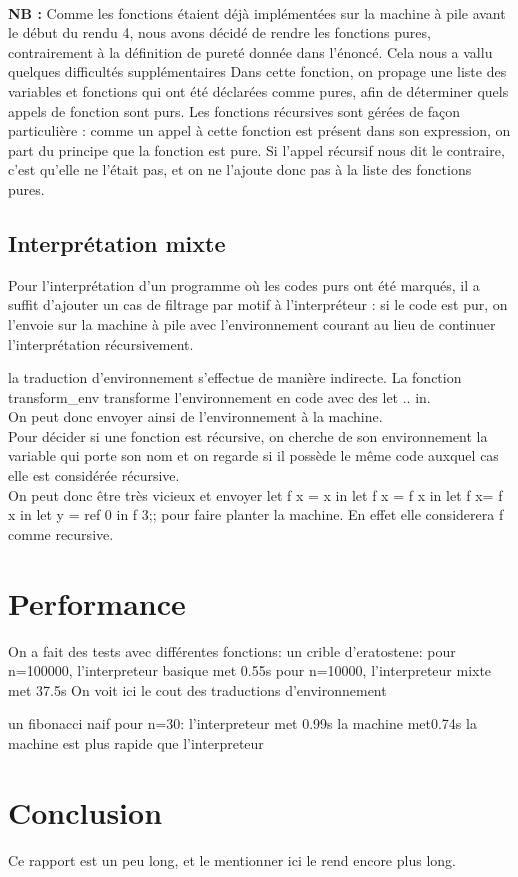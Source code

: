 \paragraph{} \textbf{NB :} Comme les fonctions étaient déjà implémentées sur la machine à pile avant le début du rendu 4, nous avons décidé de rendre les fonctions pures, contrairement à la définition de pureté donnée dans l'énoncé. Cela nous a vallu quelques difficultés supplémentaires
Dans cette fonction, on propage une liste des variables et fonctions qui ont été déclarées comme pures, afin de déterminer quels appels de fonction sont purs. Les fonctions récursives sont gérées de façon particulière : comme un appel à cette fonction est présent dans son expression, on part du principe que la fonction est pure. Si l'appel récursif nous dit le contraire, c'est qu'elle ne l'était pas, et on ne l'ajoute donc pas à la liste des fonctions pures.

\subsection{Interprétation mixte}

Pour l'interprétation d'un programme où les codes purs ont été marqués, il a suffit d'ajouter un cas de filtrage par motif à l'interpréteur : si le code est pur, on l'envoie sur la machine à pile avec l'environnement courant au lieu de continuer l'interprétation récursivement.

la traduction d'environnement s'effectue de manière indirecte. La fonction transform_env transforme l'environnement en code avec des let .. in.\\
On peut donc envoyer ainsi de l'environnement à la machine.\\
Pour décider si une fonction est récursive, on cherche de son environnement la variable qui porte son nom et on regarde si il possède le même code auxquel cas elle est considérée récursive.\\ 
On peut donc être très vicieux et envoyer let f x = x in let f x = f x in let f x= f x in let y = ref 0 in f 3;; pour faire planter la machine. En effet elle considerera f comme recursive.
\section{Performance}

On a fait des tests avec différentes fonctions:
un crible d'eratostene:
pour n=100000, l'interpreteur basique met 0.55s
pour n=10000, l'interpreteur mixte met 37.5s
On voit ici le cout des traductions d'environnement

un fibonacci naif pour n=30:
l'interpreteur met 0.99s
la machine met0.74s
la machine est plus rapide que l'interpreteur

\section*{Conclusion}

Ce rapport est un peu long, et le mentionner ici le rend encore plus long.